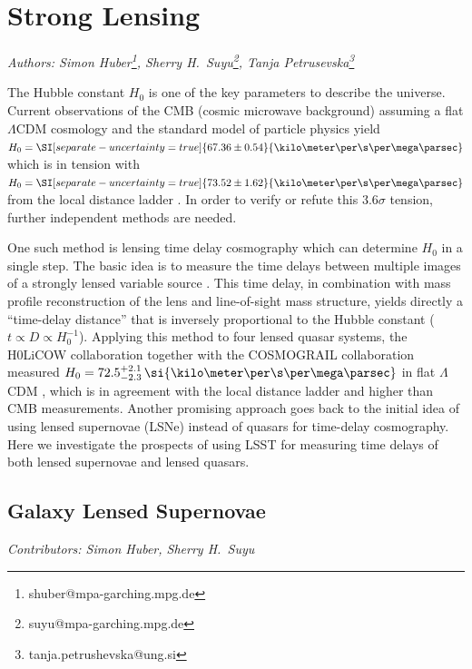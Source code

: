 


\section{Strong Lensing}
\textit{ Authors: Simon Huber\footnote{shuber@mpa-garching.mpg.de}, Sherry H.~Suyu\footnote{suyu@mpa-garching.mpg.de}, Tanja Petrusevska\footnote{tanja.petrushevska@ung.si} }

The Hubble constant $H_0$ is one of the key parameters to describe the
universe. Current observations of the CMB (cosmic microwave
background) assuming a flat $\Lambda$CDM cosmology and the standard
model of particle physics yield $H_0 = \SI[separate-uncertainty =
true]{67.36 \pm 0.54}{\kilo\meter\per\s\per\mega\parsec}$
\citep{Planck:2018vks} which is in tension with $H_0 =
\SI[separate-uncertainty = true]{73.52 \pm
  1.62}{\kilo\meter\per\s\per\mega\parsec}$ from the local distance ladder
\citep{Riess:2016jrr,Riess:2018byc}. In order to verify or refute this
$3.6 \sigma$ tension, further independent methods are needed. 

One such method is lensing time delay cosmography which can determine
$H_0$ in a single step. The basic idea is to measure the time delays
between multiple images of a strongly lensed variable source
\citep{Refsdal:1964}. This time delay, in combination with mass
profile reconstruction of the lens and line-of-sight mass structure,
yields directly a ``time-delay distance'' that is inversely
proportional to the Hubble constant ($t \propto D \propto
H_0^{-1}$). Applying this method to four lensed quasar systems, the
H0LiCOW collaboration \citep{Suyu:2016qxx} together with the
COSMOGRAIL collaboration
\citep[e.g.]{Eigenbrod:2005ie,2013Tewes,2017Courbin} measured $H_0 =
72.5^{+2.1}_{-2.3} \, \si{\kilo\meter\per\s\per\mega\parsec}$ in flat
$\Lambda$CDM \citep{Birrer:2018vtm}, which is in agreement with the
local distance ladder and higher than CMB measurements.  Another
promising approach goes back to the initial idea of
\cite{Refsdal:1964} using lensed supernovae (LSNe) instead of quasars
for time-delay cosmography. Here we investigate the prospects of using
LSST for measuring time delays of both lensed supernovae and lensed
quasars.

\subsection{Galaxy Lensed Supernovae}
\textit{Contributors: Simon Huber, Sherry H.~Suyu}

